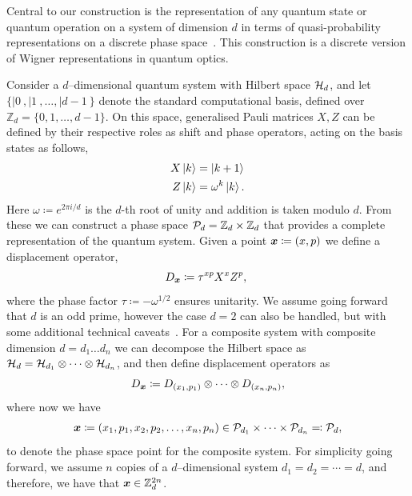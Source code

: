 \documentclass[pra,
aps,
twocolumn,
superscriptaddress,
groupedaddress,
nofootinbib,
reprint
]{revtex4-1}
\begin{document}
Central to our construction is the representation of any quantum state or quantum operation on a system of dimension $d$ in terms of quasi-probability representations on a discrete phase space~\cite{Ferrie_2008}. This construction is a discrete version of Wigner representations in quantum optics.

Consider a $d$--dimensional quantum system with Hilbert space $\H_d$, and let $\{ |0\>, |1\>, \dots , |d-1\>\}$ denote the standard computational basis, defined over $\mathbb{Z}_d = \{ 0, 1, \dots,d-1 \}$. On this space, generalised Pauli matrices $X, Z$ can be defined by their respective roles as shift and phase operators, acting on the basis states as follows,
\begin{align}
    X \ket{k} &= \ket{k + 1} \label{eq:xpauli}\\
	Z \ket{k} &= \omega^k \ket{k}. \label{eq:zpauli}
\end{align}
Here $\omega \coloneqq e^{2\pi i/d}$ is the $d$-th root of unity and addition is taken modulo $d$. From these we can construct a phase space $\cal{P}_d = \mathbb{Z}_d \times \mathbb{Z}_d$ that provides a complete representation of the quantum system. Given a point $\bmx \coloneqq (x, p)$ we define a displacement operator, 
\begin{equation}\label{eq:ddef}
    D_{\bmx} \coloneqq \tau^{x p} X^{x} Z^{p},\ 
\end{equation}
where the phase factor $\tau \coloneqq -\omega^{1/2}$ ensures unitarity. We assume going forward that $d$ is an odd prime, however the case $d=2$ can also be handled, but with some additional technical caveats~\cite{Appleby_2005}. For a composite system with composite dimension $d = d_1 \dots d_n$ we can decompose the Hilbert space as $\cal{H}_d = \cal{H}_{d_1} \otimes \dots \otimes \cal{H}_{d_n}$, and then define displacement operators as
\begin{equation}\label{eq:composited}
    D_{\bmx} \coloneqq D_{(x_1, p_1)} \otimes \dots \otimes D_{(x_n, p_n)},
\end{equation}
where now we have
\begin{align*}
	\bmx \coloneqq (x_1, p_1, x_2, p_2, \dots, x_n, p_n) \in \cal{P}_{d_1} \times \dots \times \cal{P}_{d_n} \eqqcolon  \cal{P}_d,
\end{align*}
to denote the phase space point for the composite system. 
For simplicity going forward, we assume $n$ copies of a $d$--dimensional system $d_1=d_2 = \cdots = d$, and therefore, we have that $\x \in \mathbb{Z}_d^{2n}$.
\end{document}
